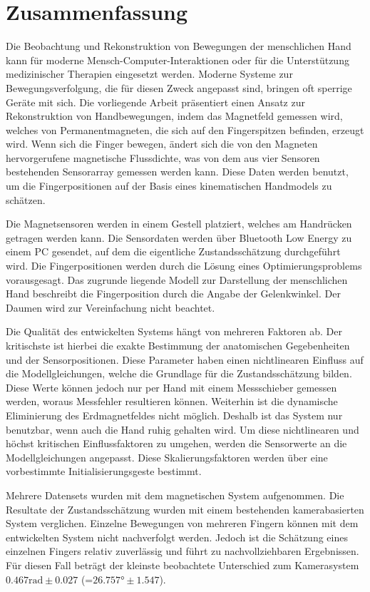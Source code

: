 

\chapter*{Zusammenfassung}

Die Beobachtung und Rekonstruktion von Bewegungen der menschlichen Hand kann f\"ur moderne Mensch-Computer-Interaktionen oder f\"ur die Unterst\"utzung medizinischer Therapien eingesetzt werden. Moderne Systeme zur Bewegungsverfolgung, die f\"ur diesen Zweck angepasst sind, bringen oft sperrige Ger\"ate mit sich. Die vorliegende Arbeit pr\"asentiert einen Ansatz zur Rekonstruktion von Handbewegungen, indem das Magnetfeld gemessen wird, welches von Permanentmagneten, die sich auf den Fingerspitzen befinden, erzeugt wird. Wenn sich die Finger bewegen, \"andert sich die von den Magneten hervorgerufene magnetische Flussdichte, was von dem aus vier Sensoren bestehenden Sensorarray gemessen werden kann. Diese Daten werden benutzt, um die Fingerpositionen auf der Basis eines kinematischen Handmodels zu sch\"atzen.

Die Magnetsensoren werden in einem Gestell platziert, welches am Handr\"ucken getragen werden kann. Die Sensordaten werden \"uber Bluetooth Low Energy zu einem PC gesendet, auf dem die eigentliche Zustandssch\"atzung durchgef\"uhrt wird. Die Fingerpositionen werden durch die L\"osung eines Optimierungsproblems vorausgesagt. Das zugrunde liegende Modell zur Darstellung der menschlichen Hand beschreibt die Fingerposition durch die Angabe der Gelenkwinkel. Der Daumen wird zur Vereinfachung nicht beachtet.

Die Qualit\"at des entwickelten Systems h\"angt von mehreren Faktoren ab. Der kritischste ist hierbei die exakte Bestimmung der anatomischen Gegebenheiten und der Sensorpositionen. Diese Parameter haben einen nichtlinearen Einfluss auf die Modellgleichungen, welche die Grundlage f\"ur die Zustandssch\"atzung bilden. Diese Werte k\"onnen jedoch nur per Hand mit einem Messschieber gemessen werden, woraus Messfehler resultieren k\"onnen. Weiterhin ist die dynamische Eliminierung des Erdmagnetfeldes nicht m\"oglich. Deshalb ist das System nur benutzbar, wenn auch die Hand ruhig gehalten wird. Um diese nichtlinearen und h\"ochst kritischen Einflussfaktoren zu umgehen, werden die Sensorwerte an die Modellgleichungen angepasst. Diese Skalierungsfaktoren werden \"uber eine vorbestimmte Initialisierungsgeste bestimmt.

Mehrere Datensets wurden mit dem magnetischen System aufgenommen. Die Resultate der Zustandssch\"atzung wurden mit einem bestehenden kamerabasierten System verglichen. Einzelne Bewegungen von mehreren Fingern k\"onnen mit dem entwickelten System nicht nachverfolgt werden. Jedoch ist die Sch\"atzung eines einzelnen Fingers relativ zuverl\"assig und f\"uhrt zu nachvollziehbaren Ergebnissen. F\"ur diesen Fall betr\"agt der kleinste beobachtete Unterschied zum Kamerasystem $ 0.467 \si{\radian} \pm 0.027 $ (=$ 26.757 \si{\degree} \pm 1.547 $).



